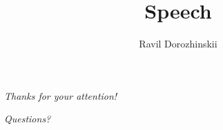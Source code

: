 \documentclass{beamer}
\title{Speech}
\author{Ravil Dorozhinskii}
\institute[]{Computational Science and Engineering}
\begin{document}
\begin{frame}
    \titlepage
\end{frame}
















\begin{frame}{}
    \centering
    \Large
  \emph{Thanks for your attention!}
  
\end{frame}

\begin{frame}{}
    \centering
    \Large
  \emph{Questions?}
\end{frame}


\begin{frame}[allowframebreaks]
        \printbibliography{}
\end{frame}
\end{document}
